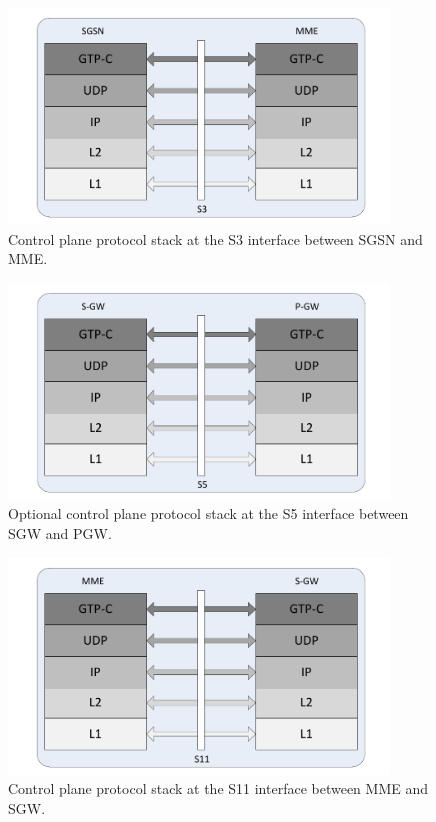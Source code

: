 \begin{figure}[htb]
	 \centering
	 \includegraphics[width=0.9\textwidth]{images/SGSN-MME-layers.pdf}
	 \caption{Control plane protocol stack at the S3 interface between SGSN and MME.}
	 \label{c4:fig:stack-sgsnmme}
\end{figure}

\begin{figure}[htb]
	\centering
	\includegraphics[width=0.9\textwidth]{images/S-GW-P-GW-layers.pdf}
	\caption{Optional control plane protocol stack at the S5 interface between SGW and PGW.}
	\label{c4:fig:stack-sgwpgw}
\end{figure}

\begin{figure}[htb]
	\centering
	\includegraphics[width=0.9\textwidth]{images/MME-S-GW-layers.pdf}
	\caption{Control plane protocol stack at the S11 interface between MME and SGW.}
	\label{c4:fig:stack-mmesgw}
\end{figure}


